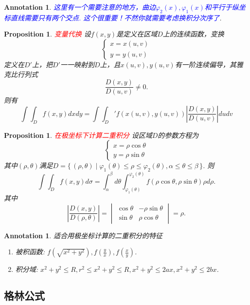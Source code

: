 \documentclass{article}
\newtheorem{proposition}[theorem]{Proposition}
\newtheorem{annotation}[theorem]{Annotation}
\newcommand\Set[2]{\{\,#1\mid#2\,\}} %
\newcommand{\redt}[1]{\textcolor{red}{#1}}
\newcommand{\bluet}[1]{\textcolor{blue}{#1}}
\begin{document}
\begin{annotation}
\rm \bluet{这里有一个需要注意的地方，曲边$\varphi_2(x),\varphi_1(x)$和平行于纵坐标直线需要只有两个交点. 这个很重要！不然你就需要考虑换积分次序了}.
\end{annotation}

\begin{proposition}
\rm \redt{变量代换} 设$f(x,y)$是定义在区域$D$上的连续函数，变换
$$
\left \{
\begin{array}{ll}
x = x(u,v)\\
y = y(u,v)
\end{array}
\right.
$$
定义在$D'$上，把$D'$一一映射到$D$上，且$x(u,v),y(u,v)$有一阶连续偏导，其雅克比行列式
$$
\frac{D(x,y)}{D(u,v)} \neq 0.
$$
则有
$$
\int\int_D f(x,y)dxdy = \int\int_D' f(x(u,v),y(u,v))\left| \frac{D(x,y)}{D(u,v)} \right| dudv
$$
\end{proposition}

\begin{proposition}
\rm \redt{在极坐标下计算二重积分} 设区域$D$的参数方程为
$$
\left \{
\begin{array}{ll}
x = \rho \cos \theta \\
y = \rho \sin \theta 
\end{array} \right.
$$
其中$(\rho,\theta)$满足$D = \Set{(\rho,\theta)}{\varphi_1(\theta) \leq \rho \leq \varphi_2(\theta), \alpha \leq \theta \leq \beta}$. 则
$$
\int\int_D f(x,y)d\sigma = \int_\alpha^\beta d\theta \int_{\varphi_1(\theta)}^{\varphi_2(\theta)} f(\rho\cos \theta,\rho\sin\theta)\rho d\rho.
$$
其中
$$
\left|\frac{D(x,y)}{D(\rho,\theta)}\right| = \begin{vmatrix}
\cos\theta &-\rho\sin\theta \\
\sin\theta & \rho\cos\theta 
\end{vmatrix} = \rho.
$$
\end{proposition}

\begin{annotation}
\rm 适合用极坐标计算的二重积分的特征
\begin{enumerate}
	\item 被积函数: $f(\sqrt{x^2+y^2}),f(\frac{y}{x}),f(\frac{x}{y})$.
	\item 积分域: $x^2+y^2 \leq R, r^2 \leq x^2+y^2 \leq R, x^2+y^2 \leq 2ax, x^2+y^2 \leq 2bx$. 
\end{enumerate}
\end{annotation}

\subsection{格林公式}
\end{document}
